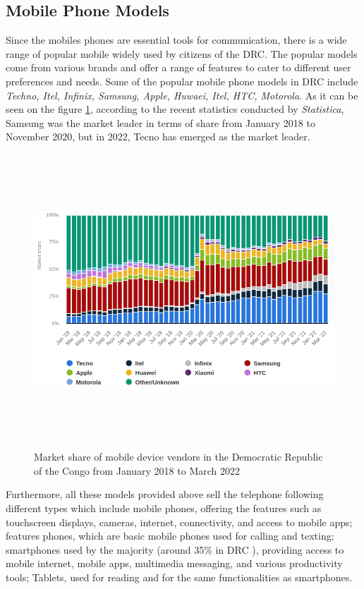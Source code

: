 \documentclass[12pt,a4paper]{report}
\begin{document}
	\subsection{Mobile Phone Models}  
	Since the mobiles phones are essential tools for communication, there is a wide range of popular mobile widely used by citizens of the DRC. The popular models come from various brands and offer a range of features to cater to different user preferences and needs. Some of the popular mobile phone models in DRC include \textit{ Techno, Itel, Infinix, Samsung, Apple, Huwaei, Itel, HTC, Motorola}. As it can be seen on the figure \ref{fig:mobilevendor}, according  to the  recent statistics conducted by \textit{Statistica},
	Samsung was the market leader in terms of share from January 2018 to November 2020, but in 2022, Tecno has emerged as the market leader.
	\begin{figure}
		\centering 
		\includegraphics[width=18cm, height=11cm]{Images/mobileMarket.png}
		\caption{Market share of mobile device vendors in the Democratic Republic of the Congo from January 2018 to March 2022}
	    \captionsetup{position=top}
		\label{fig:mobilevendor} 
	\end{figure}

Furthermore, all these models provided above sell the telephone following different types which include mobile phones, offering the features such as touchscreen displays, cameras, internet, connectivity, and access to mobile apps; features phones, which are basic mobile phones used for calling and texting; smartphones used by the majority (around 35\% in DRC ), providing access to mobile internet, mobile apps, multimedia messaging, and various productivity tools; Tablets, used for reading and for the same functionalities as smartphones.
\end{document}
